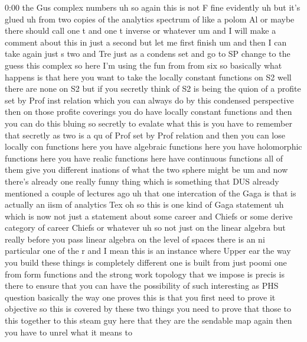 \begin{unfinished}{0:00}
the  Gus  complex  numbers  uh  so  again  this
is  not  F
fine  evidently  uh  but  it's
glued
uh
from  two  copies
of  the  analytics
spectrum  of  like  a  polom
Al  or  maybe  there  should  call  one  t  and
one  t  inverse  or  whatever
um
and  I  will  make  a  comment  about  this  in
just  a  second  but  let  me  first  finish  um
and  then  I  can
take  again  just  s
two  and  Tre  just  as  a  condens
set  and  go  to  SP  change  to  the  guess
this
complex  so  here  I'm  using  the  fun
from  from
six  so  basically  what  happens  is  that
here  you  want  to  take  the  locally
constant  functions  on
S2  well  there  are  none  on  S2  but  if  you
secretly  think  of  S2  is  being  the  quion
of  a  profite  set  by  Prof  inst  relation
which  you  can  always  do  by  this
condensed  perspective  then  on  those
profite  coverings  you  do  have  locally
constant  functions  and  then  you  can  do
this  bluing  so  secretly  to  evalate  what
this  is  you  have  to  remember  that
secretly  as  two  is  a  qu  of  Prof  set  by
Prof  relation  and  then  you  can  lose
locally  con  functions  here  you  have
algebraic  functions  here  you  have
holomorphic  functions  here  you  have
realic  functions  here  have  continuous
functions  all  of  them  give  you  different
inations  of  what  the  two  sphere  might
be
um  and  now  there's  already  one  really
funny  thing  which  is  something  that  DUS
already  mentioned  a  couple  of  lectures
ago  uh  that  one  intercation  of  the  Gaga
is  that  is  actually  an  iism  of  analytics
Tex
oh  so  this  is
one  kind  of  Gaga
statement  uh  which  is  now  not  just  a
statement  about  some  career  and  Chiefs
or  some  derive  category  of  career  Chiefs
or  whatever
uh  so  not  just  on  the  linear  algebra  but
really  before  you  pass  linear  algebra  on
the  level  of  spaces  there  is  an
ni  particular  one  of  the
r
and  I  mean  this  is  an  instance  where
Upper  ear  the  way  you  build  these  things
is  completely  different  one  is  built
from  just  poomi  one  from  form  functions
and  the  strong  work  topology  that  we
impose  is  precis  is  there  to  ensure  that
you  can  have  the  possibility  of  such
interesting  as
PHS  question  basically  the  way  one
proves  this  is
that  you  first  need  to  prove  it
objective  so  this  is  covered  by  these
two  things  you  need  to  prove  that  those
to  this  together  to  this  steam  guy  here
that  they  are  the  sendable  map  again
then  you  have  to  unrel  what  it  means  to

\end{unfinished}
